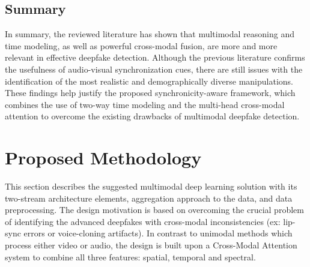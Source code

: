 \documentclass[conference]{IEEEtran}
\begin{document}
\subsection{Summary}
In summary, the reviewed literature has shown that multimodal reasoning and time modeling, as well as powerful cross-modal fusion, are more and more relevant in effective deepfake detection. Although the previous literature confirms the usefulness of audio-visual synchronization cues, there are still issues with the identification of the most realistic and demographically diverse manipulations. These findings help justify the proposed synchronicity-aware framework, which combines the use of two-way time modeling and the multi-head cross-modal attention to overcome the existing drawbacks of multimodal deepfake detection.






\section{Proposed Methodology}
This section describes the suggested multimodal deep learning solution with its two-stream architecture elements, aggregation approach to the data, and data preprocessing. The design motivation is based on overcoming the crucial problem of identifying the advanced deepfakes with cross-modal inconsistencies (ex: lip-sync errors or voice-cloning artifacts). In contrast to unimodal methods which process either video or audio, the design is built upon a Cross-Modal Attention system to combine all three features: spatial, temporal and spectral.
\end{document}
